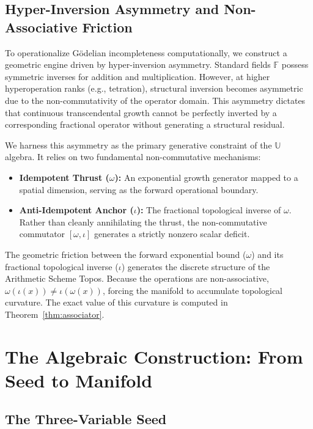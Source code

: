 \documentclass[12pt,oneside]{article}
\theoremstyle{principia}
\theoremstyle{definition}
\theoremstyle{remark}
\providecommand{\UU}{\mathbb{U}}
\providecommand{\FF}{\mathbb{F}}
\begin{document}
\subsection{Hyper-Inversion Asymmetry and Non-Associative Friction}

To operationalize G\"odelian incompleteness computationally, we construct a geometric engine driven by hyper-inversion asymmetry. Standard fields $\FF$ possess symmetric inverses for addition and multiplication. However, at higher hyperoperation ranks (e.g., tetration), structural inversion becomes asymmetric due to the non-commutativity of the operator domain. This asymmetry dictates that continuous transcendental growth cannot be perfectly inverted by a corresponding fractional operator without generating a structural residual.

We harness this asymmetry as the primary generative constraint of the $\UU$ algebra. It relies on two fundamental non-commutative mechanisms:
\begin{itemize}
\item \textbf{Idempotent Thrust ($\omega$):} An exponential growth generator mapped to a spatial dimension, serving as the forward operational boundary.
\item \textbf{Anti-Idempotent Anchor ($\iota$):} The fractional topological inverse of $\omega$. Rather than cleanly annihilating the thrust, the non-commutative commutator $[\omega, \iota]$ generates a strictly nonzero scalar deficit.
\end{itemize}

The geometric friction between the forward exponential bound ($\omega$) and its fractional topological inverse ($\iota$) generates the discrete structure of the Arithmetic Scheme Topos. Because the operations are non-associative, $\omega(\iota(x)) \neq \iota(\omega(x))$, forcing the manifold to accumulate topological curvature. The exact value of this curvature is computed in Theorem~\ref{thm:associator}.

\section{The Algebraic Construction: From Seed to Manifold}

\subsection{The Three-Variable Seed}\label{sec:seed}
\end{document}
